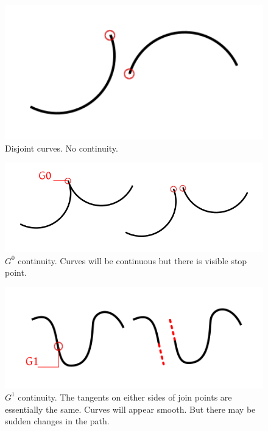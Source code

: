 \documentclass[11pt,twoside,a4paper,parskip=half]{scrartcl}
\begin{document}
\begin{figure}[h!]
	\includegraphics[width=1.0\textwidth]{images/disjoint.png}
	\caption{Disjoint curves. No continuity.}
	\label{disjoint}
\end{figure}

\begin{figure}[h!]
	\includegraphics[width=1.0\textwidth]{images/g0.png}
	\caption{$G^0$ continuity. Curves will be continuous but there is visible stop point.}
	\label{g0}
\end{figure}

\begin{figure}[h!]
	\includegraphics[width=1.0\textwidth]{images/g1.png}
	\caption{$G^1$ continuity. The tangents on either sides of join points are essentially the same. Curves will appear smooth. But there may be sudden changes in the path.}
	\label{g1}
\end{figure}
\end{document}
